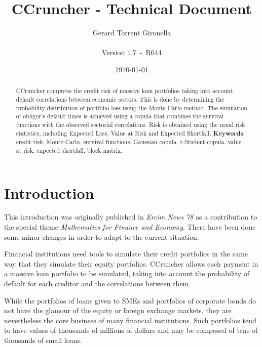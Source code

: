 \documentclass[a4paper,12pt,final]{article}
\def\numversion{1.7}
\def\svnversion{R644}
\begin{document}
\title{CCruncher - Technical Document}
\author{Gerard Torrent Gironella\\\\Version \numversion\ -\ \svnversion}
\date{\today}
\maketitle


\begin{abstract}
CCruncher computes the credit risk of massive loan portfolios 
taking into account default correlations between economic sectors. This is done 
by determining the probability distribution of portfolio loss using the Monte 
Carlo method. The simulation of obligor's default times is achieved
using a copula that combines the survival functions with the observed
sectorial correlations. Risk is obtained using the usual risk statistics, 
including Expected Loss, Value at Risk and Expected Shortfall.
\newline
\newline
\textbf{Keywords}: credit risk, Monte Carlo, survival functions, Gaussian copula, 
t-Student copula, value at risk, expected shortfall, block matrix.
\end{abstract}
\newpage


\tableofcontents
\newpage


\section{Introduction}

This introduction was originally published in \emph{Ercim News 78} \cite{ccruncher:ercim78}
as a contribution to the special theme \emph{Mathematics for Finance and Economy}.
There have been done some minor changes in order to adapt to the current situation.
\newline

Financial institutions need tools to simulate their credit portfolios in the same 
way that they simulate their equity portfolios. CCruncher allows each payment
in a massive loan portfolio to be simulated, taking into account the probability 
of default for each creditor and the correlations between them.
\newline

While the portfolios of loans given to SMEs and portfolios of corporate bonds do 
not have the glamour of the equity or foreign exchange markets, they are nevertheless 
the core business of many financial institutions. Such portfolios tend to have values 
of thousands of millions of dollars and may be composed of tens of thousands of small 
loans.
\newline
\end{document}
